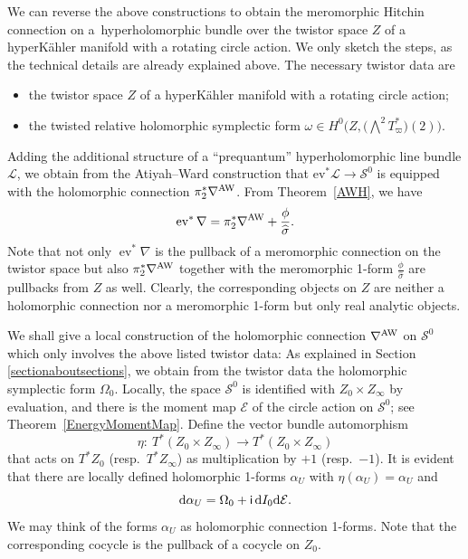 \documentclass[pdftex]{sigma}
\numberwithin{equation}{section}
\theoremstyle{definition}
\renewcommand{\i}{\mathsf{i}}
\begin{document}
We can reverse the above constructions to obtain the meromorphic Hitchin connection on a~hyperholomorphic bundle over the twistor space $Z$
of a hyperK\"ahler manifold with a rotating circle action.
We only sketch the steps, as the technical details are already explained above.
The necessary twistor data are
\begin{itemize}\itemsep=0pt
\item the twistor space $Z$ of a hyperK\"ahler manifold with a rotating circle action;
\item the twisted relative holomorphic symplectic form
$\omega \in H^0\bigl(Z, \bigl(\bigwedge^2 T_{\varpi}^*\bigr)(2)\bigr).$
\end{itemize}
Adding the additional structure of a ``prequantum'' hyperholomorphic line bundle $\mathcal L$,
we obtain from the Atiyah--Ward construction that $\text{ev}^*\mathcal L
\longrightarrow \mathcal S^0$ is equipped with the holomorphic connection $\pi_2^*\nabla^{\rm AW}$.
From Theorem~\ref{AWH}, we have
\[\operatorname{ev}^*\nabla =
\pi_2^*\nabla^{\rm AW}+ \frac{\phi}{\widehat\sigma}.\]
Note that not only $\operatorname{ev}^*\nabla$ is the pullback of a meromorphic connection on the twistor space but also
$\pi_2^*\nabla^{\rm AW}$ together with the meromorphic 1-form $\frac{\phi}{\widehat\sigma}$ are pullbacks from $Z$
as well.
Clearly, the corresponding objects on $Z$ are neither a holomorphic connection nor a meromorphic 1-form but only real analytic objects.

We shall give a local construction of the holomorphic connection $\nabla^{\rm AW}$ on $\mathcal S^0$
which only involves the above listed twistor data: As explained in Section \ref{sectionaboutsections}, we obtain from the twistor data the holomorphic symplectic form
$\Omega_0.$ Locally, the space
$\mathcal S^0$ is identified with $Z_0\times Z_\infty$ by evaluation, and there is the moment map $\mathcal E$
of the circle action on $\mathcal S^0$; see Theorem~\ref{EnergyMomentMap}.
Define the vector bundle automorphism
\[\eta \colon\ T^*(Z_0\times Z_\infty) \longrightarrow
T^*(Z_0\times Z_\infty)\]
that acts on $T^*Z_0$ (resp.\ $T^* Z_\infty$) as multiplication
by $+1$ (resp.\ $-1$). It is evident that there are locally defined holomorphic 1-forms
$\alpha_U$ with $\eta(\alpha_U) = \alpha_U$ and
\begin{equation}\label{connonS}
{\rm d}\alpha_U =
\Omega_0+\i \, {\rm d}I_0{\rm d}\mathcal E.\end{equation}
We may think of the forms $\alpha_U$ as holomorphic connection 1-forms. Note that the corresponding cocycle is the pullback of a cocycle on $Z_0.$
\end{document}
